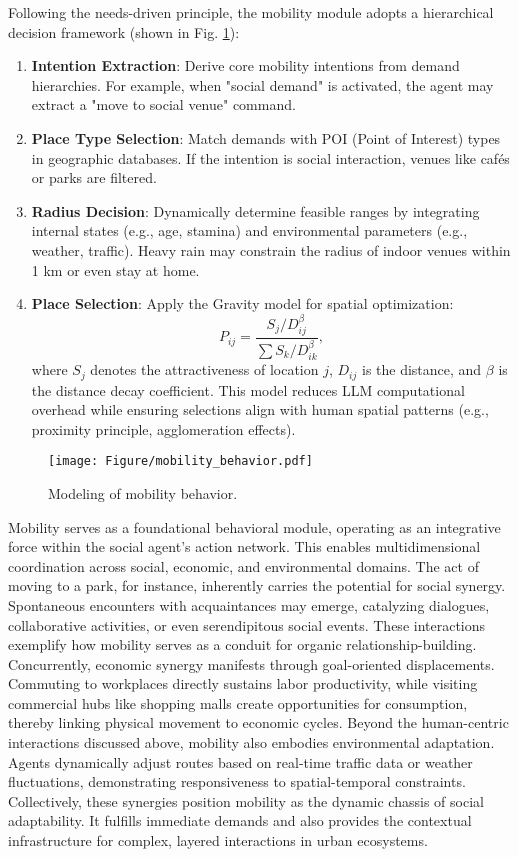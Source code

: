 Following the needs-driven principle, the mobility module adopts a hierarchical decision framework (shown in Fig. \ref{fig:mobility_behavior}):  
\begin{enumerate}
    \item \textbf{Intention Extraction}: Derive core mobility intentions from demand hierarchies. For example, when "social demand" is activated, the agent may extract a "move to social venue" command.
    \item \textbf{Place Type Selection}: Match demands with POI (Point of Interest) types in geographic databases. If the intention is social interaction, venues like cafés or parks are filtered.
    \item \textbf{Radius Decision}: Dynamically determine feasible ranges by integrating internal states (e.g., age, stamina) and environmental parameters (e.g., weather, traffic). Heavy rain may constrain the radius of indoor venues within 1 km or even stay at home.
    \item \textbf{Place Selection}: Apply the Gravity model for spatial optimization:
    \begin{equation}
        P_{ij} = \frac{S_j / D_{ij}^\beta}{\sum{S_k / D_{ik}^\beta}},
    \end{equation}
    where \(S_j\) denotes the attractiveness of location \(j\), \(D_{ij}\) is the distance, and \(\beta\) is the distance decay coefficient. This model reduces LLM computational overhead while ensuring selections align with human spatial patterns (e.g., proximity principle, agglomeration effects).
\end{enumerate}

\begin{figure}[ht]
\centering
\texttt{[image: Figure/mobility\_behavior.pdf]}
\caption{Modeling of mobility behavior.}
\label{fig:mobility_behavior}
\end{figure}

Mobility serves as a foundational behavioral module, operating as an integrative force within the social agent's action network. This enables multidimensional coordination across social, economic, and environmental domains. The act of moving to a park, for instance, inherently carries the potential for social synergy. Spontaneous encounters with acquaintances may emerge, catalyzing dialogues, collaborative activities, or even serendipitous social events. These interactions exemplify how mobility serves as a conduit for organic relationship-building. Concurrently, economic synergy manifests through goal-oriented displacements. Commuting to workplaces directly sustains labor productivity, while visiting commercial hubs like shopping malls create opportunities for consumption, thereby linking physical movement to economic cycles. Beyond the human-centric interactions discussed above, mobility also embodies environmental adaptation. Agents dynamically adjust routes based on real-time traffic data or weather fluctuations, demonstrating responsiveness to spatial-temporal constraints. Collectively, these synergies position mobility as the dynamic chassis of social adaptability. It fulfills immediate demands and also provides the contextual infrastructure for complex, layered interactions in urban ecosystems.

